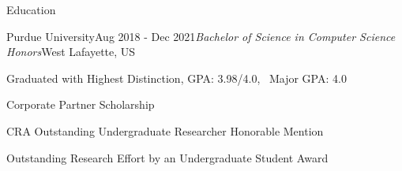 \documentclass{resume} %
\begin{document}
 

\vspace{-8.0em}
\begin{rSection}{Education}

\begin{rSubsection}{Purdue University}{Aug 2018 - Dec 2021}{\textit{Bachelor of Science in Computer Science Honors}}{West Lafayette, US}
\item Graduated with Highest Distinction, GPA: 3.98/4.0, \ Major GPA: 4.0
\item Corporate Partner Scholarship
\item CRA Outstanding Undergraduate Researcher Honorable Mention
\item Outstanding Research Effort by an Undergraduate Student Award
\end{rSubsection}

\end{rSection}

\end{document}
